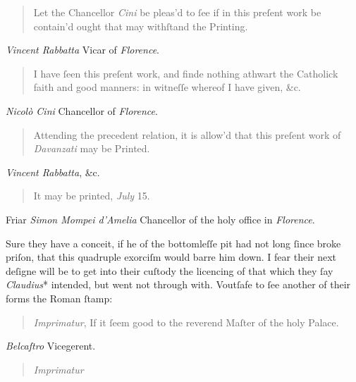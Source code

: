 \begin{quote}
    Let the Chancellor \textit{Cini} be pleas'd to ſee if in this preſent work
    be contain'd ought that may withſtand the Printing.
\end{quote}

\hfill \textit{Vincent Rabbatta} Vicar of \textit{Florence}.

\begin{quote}
    I have ſeen this preſent work, and finde nothing athwart the Catholick faith
    and good manners: in witneſſe whereof I have given, \&c.
\end{quote}

\hfill \textit{Nicolò Cini} Chancellor of \textit{Florence}.

\begin{quote}
    Attending the precedent relation, it is allow'd that this preſent work of
    \textit{Davanzati} may be Printed.
\end{quote}

\hfill \textit{Vincent Rabbatta}, \&c.

\begin{quote}
    It may be printed, \textit{July} 15.
\end{quote}

\hfill Friar \textit{Simon Mompei d'Amelia} Chancellor of the holy office in
\textit{Florence}.

\vspace{\baselineskip}

Sure they have a conceit, if he of the bottomleſſe pit had not long ſince broke
priſon, that this quadruple exorciſm would barre him down.  I fear their next
deſigne will be to get into their cuſtody the licencing of that which they ſay
\textit{Claudius}*  intended, but went not through
with.  Voutſafe to ſee another of their forms the Roman ſtamp:

\begin{quote}
    \textit{Imprimatur}, If it ſeem good to the reverend Maſter of the holy
    Palace.
\end{quote}

\hfill \textit{Belcaſtro} Vicegerent.

\begin{quote}
    \textit{Imprimatur}
\end{quote}

